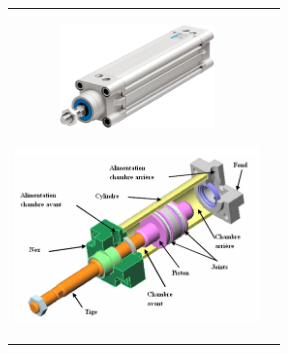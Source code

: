 \begin{tabular}{cc}
\includegraphics[width=1.60465in,height=1.07872in]{media/image75.png}

\includegraphics[width=2.54651in,height=1.82389in]{media/image76.png} \\

\end{tabular}

